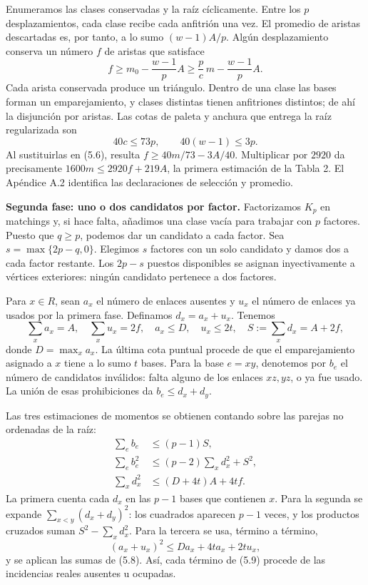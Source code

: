 \documentclass[spanish,11pt,a4paper]{article}
\begin{document}
Enumeramos las clases conservadas y la raíz cíclicamente. Entre los \(p\) desplazamientos, cada clase recibe cada anfitrión una vez. El promedio de aristas descartadas es, por tanto, a lo sumo \((w-1)A/p\). Algún desplazamiento conserva un número \(f\) de aristas que satisface \[
f\ge m_0-\frac{w-1}{p}A
\ge\frac pc\,m-\frac{w-1}{p}A.
\tag{5.6}
\] Cada arista conservada produce un triángulo. Dentro de una clase las bases forman un emparejamiento, y clases distintas tienen anfitriones distintos; de ahí la disjunción por aristas. Las cotas de paleta y anchura que entrega la raíz regularizada son \[
40c\le73p,\qquad 40(w-1)\le3p.
\tag{5.7}
\] Al sustituirlas en (5.6), resulta \(f\ge40m/73-3A/40\). Multiplicar por \(2920\) da precisamente \(1600m\le2920f+219A\), la primera estimación de la Tabla 2. El Apéndice A.2 identifica las declaraciones de selección y promedio.

\textbf{Segunda fase: uno o dos candidatos por factor.} Factorizamos \(K_p\) en matchings y, si hace falta, añadimos una clase vacía para trabajar con \(p\) factores. Puesto que \(q\ge p\), podemos dar un candidato a cada factor. Sea \(s=\max\{2p-q,0\}\). Elegimos \(s\) factores con un solo candidato y damos dos a cada factor restante. Los \(2p-s\) puestos disponibles se asignan inyectivamente a vértices exteriores: ningún candidato pertenece a dos factores.

Para \(x\in R\), sean \(a_x\) el número de enlaces ausentes y \(u_x\) el número de enlaces ya usados por la primera fase. Definamos \(d_x=a_x+u_x\). Tenemos \[
\sum_xa_x=A,\quad \sum_xu_x=2f,\quad
a_x\le D,\quad u_x\le2t,\quad
S:=\sum_xd_x=A+2f,
\tag{5.8}
\] donde \(D=\max_xa_x\). La última cota puntual procede de que el emparejamiento asignado a \(x\) tiene a lo sumo \(t\) bases. Para la base \(e=xy\), denotemos por \(b_e\) el número de candidatos inválidos: falta alguno de los enlaces \(xz,yz\), o ya fue usado. La unión de esas prohibiciones da \(b_e\le d_x+d_y\).

Las tres estimaciones de momentos se obtienen contando sobre las parejas no ordenadas de la raíz: \[
\begin{aligned}
\sum_e b_e&\le(p-1)S,\\
\sum_e b_e^2&\le(p-2)\sum_xd_x^2+S^2,\\
\sum_xd_x^2&\le(D+4t)A+4tf.
\end{aligned}
\tag{5.9}
\] La primera cuenta cada \(d_x\) en las \(p-1\) bases que contienen \(x\). Para la segunda se expande \(\sum_{x<y}(d_x+d_y)^2\): los cuadrados aparecen \(p-1\) veces, y los productos cruzados suman \(S^2-\sum_xd_x^2\). Para la tercera se usa, término a término, \[
(a_x+u_x)^2\le Da_x+4ta_x+2tu_x,
\] y se aplican las sumas de (5.8). Así, cada término de (5.9) procede de las incidencias reales ausentes u ocupadas.
\end{document}
